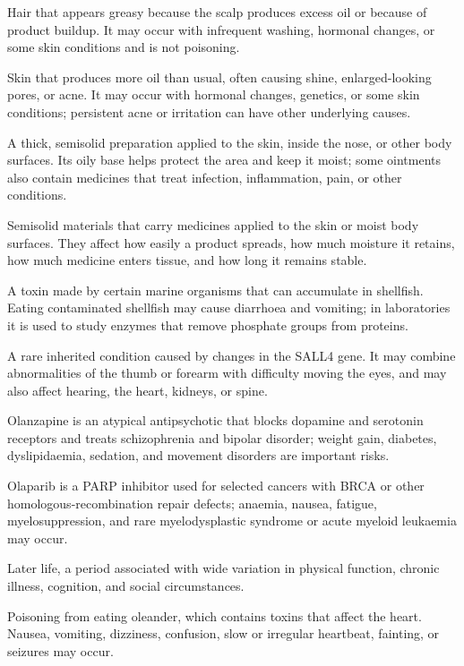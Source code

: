  Hair that appears greasy because the scalp produces excess oil or because of product buildup. It may occur with infrequent washing, hormonal changes, or some skin conditions and is not poisoning.

 Skin that produces more oil than usual, often causing shine, enlarged-looking pores, or acne. It may occur with hormonal changes, genetics, or some skin conditions; persistent acne or irritation can have other underlying causes.

 A thick, semisolid preparation applied to the skin, inside the nose, or other body surfaces. Its oily base helps protect the area and keep it moist; some ointments also contain medicines that treat infection, inflammation, pain, or other conditions.

 Semisolid materials that carry medicines applied to the skin or moist body surfaces. They affect how easily a product spreads, how much moisture it retains, how much medicine enters tissue, and how long it remains stable.

 A toxin made by certain marine organisms that can accumulate in shellfish. Eating contaminated shellfish may cause diarrhoea and vomiting; in laboratories it is used to study enzymes that remove phosphate groups from proteins.

 A rare inherited condition caused by changes in the SALL4 gene. It may combine abnormalities of the thumb or forearm with difficulty moving the eyes, and may also affect hearing, the heart, kidneys, or spine.

 Olanzapine is an atypical antipsychotic that blocks dopamine and serotonin receptors and treats schizophrenia and bipolar disorder; weight gain, diabetes, dyslipidaemia, sedation, and movement disorders are important risks.

 Olaparib is a PARP inhibitor used for selected cancers with BRCA or other homologous-recombination repair defects; anaemia, nausea, fatigue, myelosuppression, and rare myelodysplastic syndrome or acute myeloid leukaemia may occur.

 Later life, a period associated with wide variation in physical function, chronic illness, cognition, and social circumstances.

 Poisoning from eating oleander, which contains toxins that affect the heart. Nausea, vomiting, dizziness, confusion, slow or irregular heartbeat, fainting, or seizures may occur.

